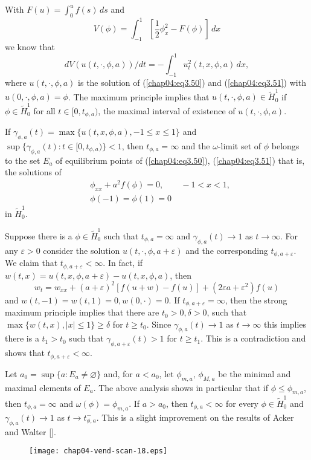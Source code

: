 \documentclass{surv-l}
\theoremstyle{plain}
\theoremstyle{definition}
\numberwithin{equation}{section}
\numberwithin{figure}{chapter}
\begin{document}
With $F(u)=\int_{0}^{u}f(s)\,ds$ and
\begin{equation*}
V(\phi)=\int_{-1}^{1}\left[\frac{1}{2}\phi_{x}^{2}-F(\phi)\right]\,dx
\end{equation*}
we know that
\begin{equation*}
dV(u(t,\cdot,\phi,a))/dt=-\int_{-1}^{1}u_{t}^{2}(t,x,\phi,a)\,dx,
\end{equation*}
where $u(t,\cdot,\phi,a)$ is the solution of (\ref{chap04:eq3.50}) and (\ref{chap04:eq3.51}) with $ u(0,\cdot,\phi,a)=\phi$. The maximum principle implies that $u(t,\cdot,\phi,a)\in\tilde{H}_{0}^{1}$ if $\phi\in\tilde{H}_{0}^{1}$ for all $t\in[0,t_{\phi,a})$, the maximal interval of existence of $u(t,\cdot,\phi,a)$.

If $\gamma_{\phi,a}(t)=\max\{u(t,x,\phi,a), -1\leq x\leq 1\}$ and $\sup\{\gamma_{\phi,a}(t)\!:t\in[0,t_{\phi,a})\}<1$, then $ t_{\phi,a}=\infty$ and the $\omega$-limit set of $\phi$ belongs to the set $E_{a}$ of equilibrium points of (\ref{chap04:eq3.50}), (\ref{chap04:eq3.51}) that is, the solutions of
\begin{equation}\label{chap04:eq3.52}
\begin{split}
&\phi_{xx}+a^{2}f(\phi)=0,\qquad -1<x<1,\\
&\phi(-1)=\phi(1)=0
\end{split}
\end{equation}
in $\tilde{H}_{0}^{1}$.

Suppose there is a $\phi \in\tilde{H}_{0}^{1}$ such that $ t_{\phi,a}=\infty$ and $\gamma_{\phi,a}(t)\rightarrow 1$ as $ t\rightarrow\infty$. For any $\varepsilon>0$ consider the solution $u(t,\cdot,\phi,a+\varepsilon)$ and the corresponding $t_{\phi,a+\varepsilon}$. We claim that $ t_{\phi,a+\varepsilon}<\infty$. In fact, if $w(t,x)=u(t,x,\phi,a+\varepsilon)-u(t,x,\phi,a)$, then
\begin{equation*}
w_{t}=w_{xx}+(a+\varepsilon)^{2}[f(u+w)-f(u)]+(2\varepsilon a+\varepsilon^{2})f(u)
\end{equation*}
and $w(t,-1)=w(t,1)=0,w(0,\cdot)=0$. If $ t_{\phi,a+\varepsilon}=\infty$,
then the strong maximum principle implies that there are $t_{0}>0,\delta>0$, such that $\displaystyle \max\{w(t,x),|x|\leq 1\}\geq\delta$ for $t\geq t_{0}$. Since $\gamma_{\phi,a}(t)\rightarrow 1$ as $ t\rightarrow\infty$ this implies there is a $t_{1}>t_{0}$ such that $\gamma_{\phi,a+\varepsilon}(t)>1$ for $t\geq t_{1}$. This is a contradiction and shows that $ t_{\phi,a+\varepsilon}<\infty$.

Let $a_{0}=\sup\{a\!:E_{a}\neq\varnothing\}$ and, for $a<a_{0}$, let $\phi_{m,a},\,\phi_{M,a}$ be the minimal and maximal elements of $E_{a}$. The above analysis shows in particular that if $\phi \leq\phi_{m,a}$, then $ t_{\phi,a}=\infty$ and $\omega(\phi)=\phi_{m,a}$. If $a>a_{0}$, then $ t_{\phi,a}<\infty$ for every $\phi\in\tilde{H}_{0}^{1}$ and $\gamma_{\phi,a}(t)\rightarrow 1$ as $t\rightarrow t_{\phi,a}^{-}$. This is a slight improvement on the results of Acker and Walter [\citeyear{1976aw}].
\begin{figure}
\texttt{[image: chap04-vend-scan-18.eps]}
\caption{}\label{fig3.16}
\end{figure}
\end{document}
